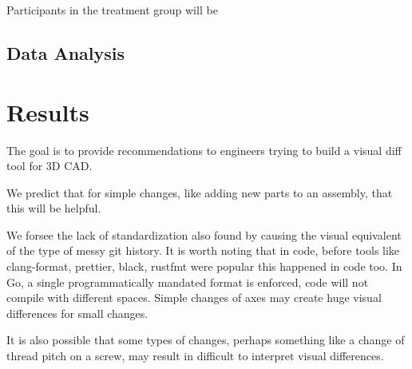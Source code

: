 \documentclass[sigconf,]{acmart}
\begin{document}
Participants in the treatment group will be

\subsection{Data Analysis}

\section{Results}

The goal is to provide recommendations to engineers trying to build a visual diff tool for 3D CAD.

We predict that for simple changes, like adding new parts to an assembly, that this will be helpful.

We forsee the lack of standardization also found by \citet{cheng2023age} causing the visual equivalent of the type of messy git history.
It is worth noting that in code, before tools like clang-format, prettier, black, rustfmt were popular this happened in code too.
In Go, a single programmatically mandated format is enforced, code will not compile with different spaces.
Simple changes of axes may create huge visual differences for small changes.

It is also possible that some types of changes, perhaps something like a change of thread pitch on a screw, may result in difficult to interpret visual differences.




\section{}






\end{document}
